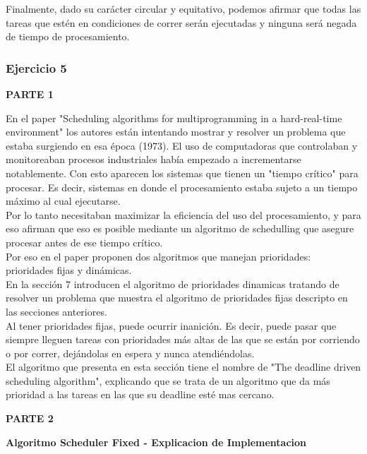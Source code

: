 \indent Finalmente, dado su carácter circular y equitativo, podemos afirmar que todas las tareas que 
estén en condiciones de correr serán ejecutadas y ninguna será negada de tiempo de procesamiento.\\


\subsubsection[Resolución Ejercicio 5]{Ejercicio 5}
\begin{center}
\textbf{PARTE 1}\\ 
\end{center}



En el paper "Scheduling algorithms for multiprogramming
in a hard-real-time environment" los autores están intentando mostrar y resolver un problema que estaba surgiendo en esa época (1973). El uso de computadoras que controlaban y monitoreaban procesos industriales había empezado a incrementarse notablemente. Con esto aparecen los sistemas que tienen un "tiempo crítico" para procesar. Es decir, sistemas en donde el procesamiento estaba sujeto a un tiempo máximo al cual ejecutarse.\\
Por lo tanto necesitaban maximizar la eficiencia del uso del procesamiento, y para eso afirman que eso es posible mediante un algoritmo de schedulling que asegure procesar antes de ese tiempo crítico.\\
Por eso en el paper proponen dos algoritmos que manejan prioridades: prioridades fijas y dinámicas.\\


En la sección 7 introducen el algoritmo de prioridades dinamicas tratando de resolver un problema que muestra el algoritmo de prioridades fijas descripto en las secciones anteriores.\\
Al tener prioridades fijas, puede ocurrir inanición. Es decir, puede pasar que siempre lleguen tareas con prioridades más altas de las que se están por corriendo o por correr, dejándolas en espera y nunca atendiéndolas.\\
El algoritmo que presenta en esta sección tiene el nombre de "The deadline driven scheduling algorithm", explicando que se trata de un algoritmo que da más prioridad a las tareas en las que su deadline esté mas cercano. \\



\begin{center}
 
\textbf{PARTE 2}\\

\end{center}
\hspace{3pt}
\begin{center}
\textbf{Algoritmo Scheduler Fixed - Explicacion de Implementacion}\\ 
\end{center}





